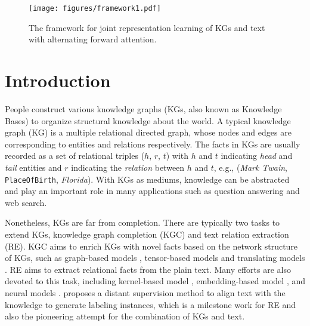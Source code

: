 \documentclass[letterpaper]{article} %
\begin{document}
\begin{abstract}
\end{abstract}



\begin{figure*}[t]
\centering
\texttt{[image: figures/framework1.pdf]}
\caption{The framework for joint representation learning of KGs and text with alternating forward attention.}
\label{fig:joinglearning}
\end{figure*}

\section{Introduction}
\label{intro}


People construct various knowledge graphs (KGs, also known as Knowledge Bases) to organize structural knowledge about the world. A typical knowledge graph (KG) is a multiple relational directed graph, whose nodes and edges are corresponding to entities and relations respectively. The facts in KGs are usually recorded as a set of relational triples ($h$, $r$, $t$) with $h$ and $t$ indicating \emph{head} and \emph{tail} entities and $r$ indicating the \emph{relation} between $h$ and $t$, e.g., (\emph{Mark Twain}, \texttt{PlaceOfBirth}, \emph{Florida}). With KGs as mediums, knowledge can be abstracted and play an important role in many applications such as question answering and web search.

Nonetheless, KGs are far from completion. There are typically two tasks to extend KGs, knowledge graph completion (KGC) and text relation extraction (RE). KGC aims to enrich KGs with novel facts based on the network structure of KGs, such as graph-based models \cite{lao2010relational,lao2011random}, tensor-based models \cite{socher2013reasoning,nickel2016holographic} and translating models \cite{bordes2013translating,ji2015knowledge}. RE aims to extract relational facts from the plain text. Many efforts are also devoted to this task, including kernel-based model \cite{zelenko2003kernel}, embedding-based model \cite{gormley2015improved}, and neural models \cite{socher2012semantic,zeng2014relation}. \cite{mintz2009distant} proposes a distant supervision method to align text with the knowledge to generate labeling instances, which is a milestone work for RE and also the pioneering attempt for the combination of KGs and text.
\end{document}
